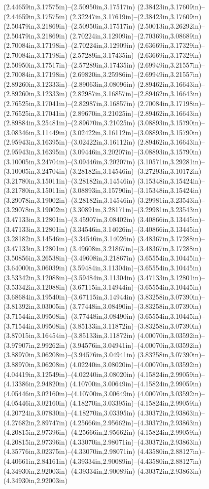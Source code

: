 (2.44659in,3.17575in)--(2.50950in,3.17517in) (2.38423in,3.17609in)--(2.44659in,3.17575in) (2.32247in,3.17619in)--(2.38423in,3.17609in) (2.50479in,3.21869in)--(2.50950in,3.17517in) (2.50013in,3.26292in)--(2.50479in,3.21869in) (2.70224in,3.12909in)--(2.70369in,3.08689in) (2.70084in,3.17198in)--(2.70224in,3.12909in) (2.63669in,3.17329in)--(2.70084in,3.17198in) (2.57289in,3.17435in)--(2.63669in,3.17329in) (2.50950in,3.17517in)--(2.57289in,3.17435in) (2.69949in,3.21557in)--(2.70084in,3.17198in) (2.69820in,3.25986in)--(2.69949in,3.21557in) (2.89260in,3.12333in)--(2.89063in,3.08096in) (2.89462in,3.16643in)--(2.89260in,3.12333in) (2.82987in,3.16857in)--(2.89462in,3.16643in) (2.76525in,3.17041in)--(2.82987in,3.16857in) (2.70084in,3.17198in)--(2.76525in,3.17041in) (2.89670in,3.21025in)--(2.89462in,3.16643in) (2.89884in,3.25481in)--(2.89670in,3.21025in) (3.08893in,3.15790in)--(3.08346in,3.11449in) (3.02422in,3.16112in)--(3.08893in,3.15790in) (2.95943in,3.16395in)--(3.02422in,3.16112in) (2.89462in,3.16643in)--(2.95943in,3.16395in) (3.09446in,3.20207in)--(3.08893in,3.15790in) (3.10005in,3.24704in)--(3.09446in,3.20207in) (3.10571in,3.29281in)--(3.10005in,3.24704in) (3.28182in,3.14546in)--(3.27293in,3.10172in) (3.21780in,3.15011in)--(3.28182in,3.14546in) (3.15348in,3.15424in)--(3.21780in,3.15011in) (3.08893in,3.15790in)--(3.15348in,3.15424in) (3.29078in,3.19002in)--(3.28182in,3.14546in) (3.29981in,3.23543in)--(3.29078in,3.19002in) (3.30891in,3.28171in)--(3.29981in,3.23543in) (3.47133in,3.12801in)--(3.45907in,3.08402in) (3.40866in,3.13445in)--(3.47133in,3.12801in) (3.34546in,3.14026in)--(3.40866in,3.13445in) (3.28182in,3.14546in)--(3.34546in,3.14026in) (3.48367in,3.17288in)--(3.47133in,3.12801in) (3.49608in,3.21867in)--(3.48367in,3.17288in) (3.50856in,3.26538in)--(3.49608in,3.21867in) (3.65554in,3.10445in)--(3.64000in,3.06039in) (3.59484in,3.11304in)--(3.65554in,3.10445in) (3.53342in,3.12088in)--(3.59484in,3.11304in) (3.47133in,3.12801in)--(3.53342in,3.12088in) (3.67115in,3.14944in)--(3.65554in,3.10445in) (3.68684in,3.19540in)--(3.67115in,3.14944in) (3.83258in,3.07390in)--(3.81392in,3.03005in) (3.77448in,3.08490in)--(3.83258in,3.07390in) (3.71544in,3.09508in)--(3.77448in,3.08490in) (3.65554in,3.10445in)--(3.71544in,3.09508in) (3.85133in,3.11872in)--(3.83258in,3.07390in) (3.87015in,3.16454in)--(3.85133in,3.11872in) (4.00070in,3.03592in)--(3.97907in,2.99262in) (3.94576in,3.04941in)--(4.00070in,3.03592in) (3.88970in,3.06208in)--(3.94576in,3.04941in) (3.83258in,3.07390in)--(3.88970in,3.06208in) (4.02240in,3.08020in)--(4.00070in,3.03592in) (4.04419in,3.12549in)--(4.02240in,3.08020in) (4.15824in,2.99059in)--(4.13386in,2.94820in) (4.10700in,3.00649in)--(4.15824in,2.99059in) (4.05446in,3.02160in)--(4.10700in,3.00649in) (4.00070in,3.03592in)--(4.05446in,3.02160in) (4.18270in,3.03395in)--(4.15824in,2.99059in) (4.20724in,3.07830in)--(4.18270in,3.03395in) (4.30372in,2.93863in)--(4.27682in,2.89747in) (4.25666in,2.95662in)--(4.30372in,2.93863in) (4.20815in,2.97396in)--(4.25666in,2.95662in) (4.15824in,2.99059in)--(4.20815in,2.97396in) (4.33070in,2.98071in)--(4.30372in,2.93863in) (4.35776in,3.02375in)--(4.33070in,2.98071in) (4.43580in,2.88127in)--(4.40661in,2.84161in) (4.39334in,2.90089in)--(4.43580in,2.88127in) (4.34930in,2.92003in)--(4.39334in,2.90089in) (4.30372in,2.93863in)--(4.34930in,2.92003in) 
